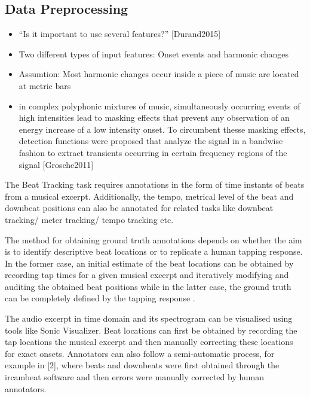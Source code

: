 \documentclass{scrartcl}
\begin{document}
\subsection{Data Preprocessing}

\begin{itemize}
\item ``Is it important to use several features?'' [Durand2015]
\item Two different types of input features: Onset events and harmonic changes
\item Assumtion: Most harmonic changes occur inside a piece of music are located at metric bars \cite[Khadkevich2012]{Khadkevich2012}
\item in complex polyphonic mixtures of music, simultaneously occurring events of high intensities lead to masking effects that prevent any observation of an energy increase of a low intensity onset. To circumbent thesse masking effects, detection functions were proposed that analyze the signal in a bandwise fashion to extract transients occurring in certain frequency regions of the signal [Grosche2011]
\end{itemize}



The Beat Tracking task requires annotations in the form of time instants of beats from a musical excerpt. Additionally, the tempo, metrical level of the beat and downbeat positions can also be annotated for related tasks like downbeat tracking/ meter tracking/ tempo tracking etc.

The method for obtaining ground truth annotations depends on whether the aim is to identify descriptive beat locations or to replicate a human tapping response. In the former case, an initial estimate of the beat locations can be obtained by recording tap times for a given musical excerpt and iteratively modifying and auditing the obtained beat positions while in the latter case, the ground truth can be completely defined by the tapping response \cite{Davies2009b}.

The audio excerpt in time domain and its spectrogram can be visualised using tools like Sonic Visualizer. Beat locations can first be obtained by recording the tap locations the musical excerpt and then manually correcting these locations for exact onsets.  Annotators can also follow a semi-automatic process, for example in [2], where beats and downbeats were first obtained through the ircambeat software and then errors were manually corrected by human annotators.
\end{document}
